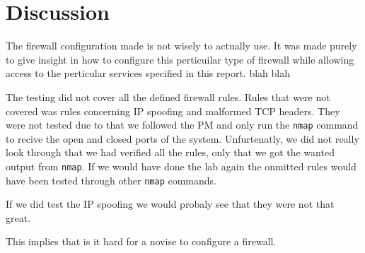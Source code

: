 \section{Discussion} 
\label{sec:discussion}

The firewall configuration made is not wisely to actually use. It was made purely to give insight in how to configure this perticuilar type of firewall while allowing access to the perticular services specified in this report. blah blah

The testing did not cover all the defined firewall rules. Rules that were not covered was rules concerning IP spoofing and malformed TCP headers. They were not tested due to that we followed the \lab PM and only run the \texttt{nmap} command to recive the open and closed ports of the system. Unfurtenatly, we did not really look through that we had verified all the rules, only that we got the wanted output from \texttt{nmap}. If we would have done the lab again the onmitted rules would have been tested through other \texttt{nmap} commands. 

If we did test the IP spoofing we would probaly see that they were not that great.

This implies that is it hard for a novise to configure a firewall.




